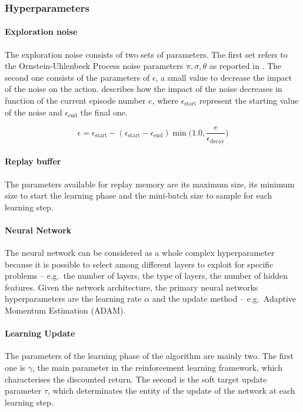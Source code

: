 \subsubsection{Hyperparameters} \label{hpddpg}

\paragraph{Exploration noise} The exploration noise consists of two sets of parameters.
The first set refers to the Ornstein-Uhlenbeck Process noise parameters $\pi, \sigma, \theta$ as reported in \cite{uhlenbeck1930theory}.
The second one consists of the parameters of $\epsilon$, a small value to decrease the impact of the noise on the action.
 describes how the impact of the noise decreases in function of the current episode number $e$, where $\epsilon_{\text{start}}$ represent the starting value of the noise and $\epsilon_{\text{end}}$ the final one.

\begin{equation} \label{eq:epsilon}
	\epsilon = \epsilon_{\text{start}} - (\epsilon_{\text{start}} -\epsilon_{\text{end}}) \min\Bigg(1.0, \frac{e}{\epsilon_{\text{decay}}}\Bigg)
\end{equation}

\paragraph{Replay buffer} The parameters available for replay memory are its maximum size, its minimum size to start the learning phase and the mini-batch size to sample for each learning step.

\paragraph{Neural Network} The neural network can be considered as a whole complex hyperparameter because it is possible to select among different layers to exploit for specific problems -- e.g.\ the number of layers, the type of layers, the number of hidden features.
Given the network architecture, the primary neural networks hyperparameters are the learning rate $\alpha$ and the update method -- e.g.\ Adaptive Momentum Estimation (ADAM).

\paragraph{Learning Update} The parameters of the learning phase of the algorithm are mainly two.
The first one is $\gamma$, the main parameter in the reinforcement learning framework, which characterises the discounted return.
The second is the soft target update parameter $\tau$, which determinates the entity of the update of the network at each learning step.

